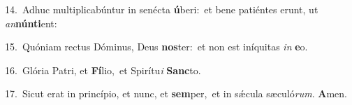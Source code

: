 {\numbfont\textcolor{\numbcolor}{14.}}~Adhuc multiplicabúntur in senécta \textbf{ú}\-beri:~\star et bene patiéntes erunt, ut \textit{an}\-\textbf{nún}\textbf{ti}ent:\par
{\numbfont\textcolor{\numbcolor}{15.}}~Quóniam rectus Dóminus, Deus \textbf{nos}\-ter:~\star et non est iníquitas \textit{in} \textbf{e}\-o.\par
{\numbfont\textcolor{\numbcolor}{16.}}~Glória Patri, et \textbf{Fí}\-lio,~\star et Spirítu\textit{i} \textbf{Sanc}\-to.\par
{\numbfont\textcolor{\numbcolor}{17.}}~Sicut erat in princípio, et nunc, et \textbf{sem}\-per,~\star et in sǽcula sæculó\-\textit{rum}\-. \textbf{A}\-men.\par
